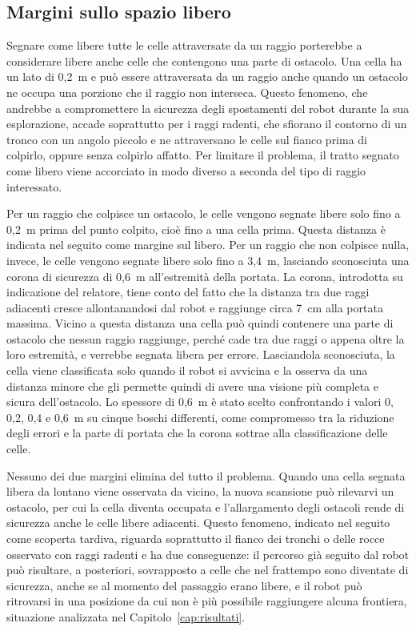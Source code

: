 \subsection{Margini sullo spazio libero}
\label{sec:margini}

Segnare come libere tutte le celle attraversate da un raggio porterebbe a considerare libere anche celle che contengono una parte di ostacolo. Una cella ha un lato di 0,2~m e può essere attraversata da un raggio anche quando un ostacolo ne occupa una porzione che il raggio non interseca. Questo fenomeno, che andrebbe a compromettere la sicurezza degli spostamenti del robot durante la sua esplorazione, accade soprattutto per i raggi radenti, che sfiorano il contorno di un tronco con un angolo piccolo e ne attraversano le celle sul fianco prima di colpirlo, oppure senza colpirlo affatto. Per limitare il problema, il tratto segnato come libero viene accorciato in modo diverso a seconda del tipo di raggio interessato.

Per un raggio che colpisce un ostacolo, le celle vengono segnate libere solo fino a 0,2~m prima del punto colpito, cioè fino a una cella prima. Questa distanza è indicata nel seguito come margine sul libero. Per un raggio che non colpisce nulla, invece, le celle vengono segnate libere solo fino a 3,4~m, lasciando sconosciuta una corona di sicurezza di 0,6~m all'estremità della portata. La corona, introdotta su indicazione del relatore, tiene conto del fatto che la distanza tra due raggi adiacenti cresce allontanandosi dal robot e raggiunge circa 7~cm alla portata massima. Vicino a questa distanza una cella può quindi contenere una parte di ostacolo che nessun raggio raggiunge, perché cade tra due raggi o appena oltre la loro estremità, e verrebbe segnata libera per errore. Lasciandola sconosciuta, la cella viene classificata solo quando il robot si avvicina e la osserva da una distanza minore che gli permette quindi di avere una visione più completa e sicura dell'ostacolo. Lo spessore di 0,6~m è stato scelto confrontando i valori 0, 0,2, 0,4 e 0,6~m su cinque boschi differenti, come compromesso tra la riduzione degli errori e la parte di portata che la corona sottrae alla classificazione delle celle.

Nessuno dei due margini elimina del tutto il problema. Quando una cella segnata libera da lontano viene osservata da vicino, la nuova scansione può rilevarvi un ostacolo, per cui la cella diventa occupata e l'allargamento degli ostacoli rende di sicurezza anche le celle libere adiacenti. Questo fenomeno, indicato nel seguito come scoperta tardiva, riguarda soprattutto il fianco dei tronchi o delle rocce osservato con raggi radenti e ha due conseguenze: il percorso già seguito dal robot può risultare, a posteriori, sovrapposto a celle che nel frattempo sono diventate di sicurezza, anche se al momento del passaggio erano libere, e il robot può ritrovarsi in una posizione da cui non è più possibile raggiungere alcuna frontiera, situazione analizzata nel Capitolo~\ref{cap:risultati}.

